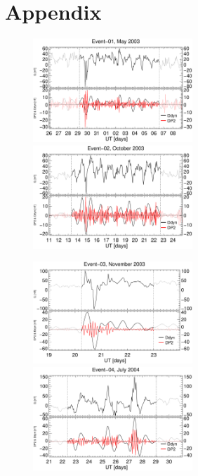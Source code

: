 \documentclass[a4paper,fleqn]{cas-dc}
\begin{document}
\section{Appendix}
\label{apend}
\begin{figure}[h!]
    \centering
    \centerline{\Large \bf   
         \hfill}
          \centerline{\Large \bf   
      \hspace{0.26\textwidth}  \color{black}{}
       \hspace{0.31\textwidth}  \color{black}{}
         \hfill}
     \includegraphics[width=6.0cm]{images/diono/iono_PI_V1_2003-05-26.eps}
     \includegraphics[width=6.0cm]{images/diono/iono_PI_V1_2003-10-11.eps}
     \centerline{\Large \bf   
      \hspace{0.275\textwidth}  \color{black}{}
       \hspace{0.295\textwidth}  \color{black}{}
         \hfill}
     \includegraphics[width=6.0cm]{images/diono/iono_PI_V1_2003-11-19.eps}     
     \includegraphics[width=6.0cm]{images/diono/iono_PI_V1_2004-07-21.eps}

\end{figure}
\end{document}
